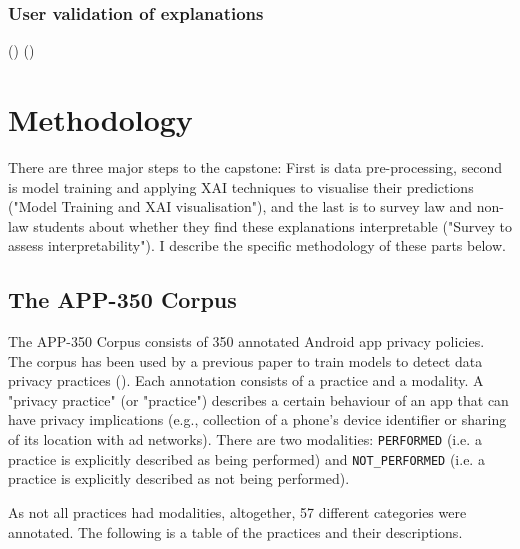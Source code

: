 \subsubsection{User validation of explanations}
(\cite{gorski2021})
(\cite{rosenfeld2021})

\section{Methodology}
There are three major steps to the capstone: First is data pre-processing, second is model training and applying XAI techniques to visualise their predictions ("Model Training and XAI visualisation"), and the last is to survey law and non-law students about whether they find these explanations interpretable ("Survey to assess interpretability"). I describe the specific methodology of these parts below.

\subsection{The APP-350 Corpus}
\label{app350_corpus}
The APP-350 Corpus consists of 350 annotated Android app privacy policies. The corpus has been used by a previous paper to train models to detect data privacy practices (\cite{zimmeck2019}). Each annotation consists of a practice and a modality. A "privacy practice" (or "practice") describes a certain behaviour of an app that can have privacy implications (e.g., collection of a phone's device identifier or sharing of its location with ad networks). There are two modalities: \texttt{PERFORMED} (i.e. a practice is explicitly described as being performed) and \texttt{NOT\_PERFORMED} (i.e. a practice is explicitly described as not being performed).

As not all practices had modalities, altogether, 57 different categories were annotated. The following is a table of the practices and their descriptions.

